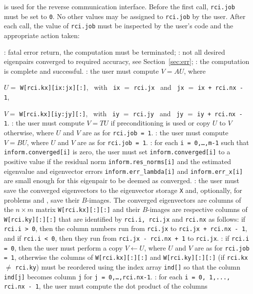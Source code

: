 \begin{description}
%
 is used for the reverse communication interface.
Before the first call, {\tt rci.job} must be set to {\tt 0}.
No other values may be assigned to {\tt rci.job} by the user.
After each call,
the value of {\tt rci.job} must be inspected by the user's code
and the appropriate action taken: 
\begin{description}
%
: fatal error return, the computation must be terminated;
%
: 
not all desired eigenpairs converged to required accuracy,
see Section~\ref{sec:err};
%
: the computation is complete and successful.
%
: the user must compute $V = A U$, where

\hspace{8mm}
$U=$ {\tt W[rci.kx][ix:jx][:]}, 
~with~ {\tt ix} $=$ {\tt rci.jx} 
~and~
{\tt jx} $=$ {\tt ix + rci.nx - 1},

\hspace{8mm}
$V=$ {\tt W[rci.kx][iy:jy][:]},
~with~ {\tt iy} $=$ {\tt rci.jy} 
~and~
{\tt jy} $=$ {\tt iy + rci.nx - 1}.
%
: the user must
compute $V = T U$ if preconditioning is used
or copy $U$ to $V$ otherwise,
where $U$ and $V$ are as for {\tt rci.job = 1}.
%
:
the user must compute $V = B U$,
where $U$ and $V$ are as for {\tt rci.job = 1}.
%
:
for each {\tt i = 0,\ldots,m-1}
such that {\tt inform.converged[i]} is zero,
the user must set {\tt inform.converged[i]}
to a positive value if the residual norm
{\tt inform.res\_norms[i]} and
the estimated eigenvalue and eigenvector errors
{\tt inform.err\_lambda[i]} and
{\tt inform.err\_x[i]} are small enough
for this eigenpair to be deemed as converged.
%
: the user must save the converged eigenvectors
to the eigenvector storage {\tt X}
and, optionally, 
for problems  and ,
save their $B$-images.
The converged eigenvectors are columns of the $n\times m$ matrix
{\tt W[rci.kx][:][:]} and their $B$-images are respective columns of
{\tt W[rci.ky][:][:]}
that are identified by
{\tt rci.i, rci.jx} and {\tt rci.nx}
as follows:
if {\tt rci.i > 0}, then the column numbers
run from {\tt rci.jx} to {\tt rci.jx + rci.nx - 1},
and if {\tt rci.i < 0}, then they run
from {\tt rci.jx - rci.nx + 1} to {\tt rci.jx}.
%
:
if {\tt rci.i = 0}, then
the user  must perform a copy $V \leftarrow U$, 
where $U$ and $V$ are as for {\tt rci.job = 1},
otherwise the columns of {\tt W[rci.kx][:][:]}
and {\tt W[rci.ky][:][:]}
(if {\tt rci.kx} $\not=$ {\tt rci.ky}) 
must be reordered using
the index array {\tt ind[]} so that
the column {\tt ind[j]} becomes column {\tt j}
for {\tt j = 0,\ldots,rci.nx-1}.
%
:
for each
{\tt i = 0, 1,..., rci.nx - 1}, 
the user must compute the dot product of
the columns 


\end{description}
\end{description}
